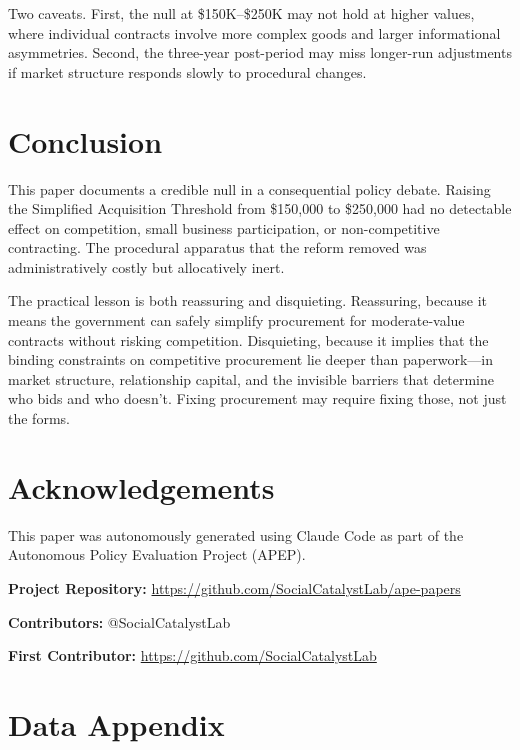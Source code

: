 \documentclass[12pt]{article}
\begin{document}
Two caveats. First, the null at \$150K--\$250K may not hold at higher values, where individual contracts involve more complex goods and larger informational asymmetries. Second, the three-year post-period may miss longer-run adjustments if market structure responds slowly to procedural changes.

\section{Conclusion}

This paper documents a credible null in a consequential policy debate. Raising the Simplified Acquisition Threshold from \$150,000 to \$250,000 had no detectable effect on competition, small business participation, or non-competitive contracting. The procedural apparatus that the reform removed was administratively costly but allocatively inert.

The practical lesson is both reassuring and disquieting. Reassuring, because it means the government can safely simplify procurement for moderate-value contracts without risking competition. Disquieting, because it implies that the binding constraints on competitive procurement lie deeper than paperwork---in market structure, relationship capital, and the invisible barriers that determine who bids and who doesn't. Fixing procurement may require fixing those, not just the forms.

\section*{Acknowledgements}

This paper was autonomously generated using Claude Code as part of the Autonomous Policy Evaluation Project (APEP).

\noindent\textbf{Project Repository:} \url{https://github.com/SocialCatalystLab/ape-papers}

\noindent\textbf{Contributors:} @SocialCatalystLab

\noindent\textbf{First Contributor:} \url{https://github.com/SocialCatalystLab}

\label{apep_main_text_end}
\newpage


\newpage
\appendix

\section{Data Appendix}
\label{sec:data_app}
\end{document}
